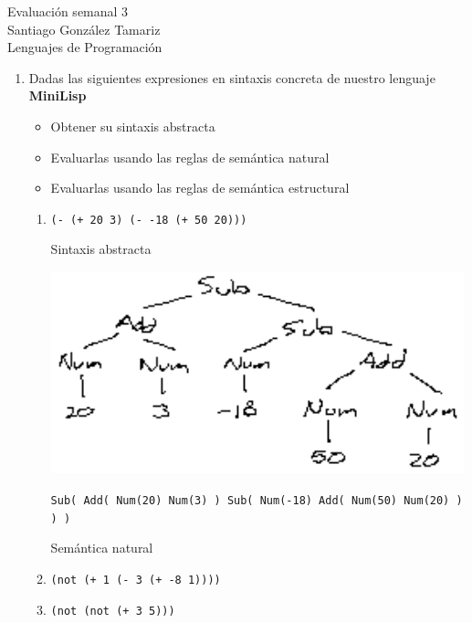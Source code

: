 \documentclass{article}
\begin{document}
  \begin{center}
    {\Large Evaluación semanal 3}\\
    {Santiago González Tamariz}\\
    {\small Lenguajes de Programación}
  \end{center}

  \begin{enumerate}
    \item Dadas las siguientes expresiones en sintaxis concreta de nuestro lenguaje \textbf{MiniLisp}
      \begin{itemize}
        \item Obtener su sintaxis abstracta
        \item Evaluarlas usando las reglas de semántica natural
        \item Evaluarlas usando las reglas de semántica estructural
      \end{itemize}
      \begin{enumerate}
        \item \texttt{(- (+ 20 3) (- -18 (+ 50 20)))}
          
          Sintaxis abstracta
          \begin{center}
            \includegraphics[width=12cm]{asa1.png}
          \end{center}
          \texttt{Sub( Add( Num(20) Num(3) ) Sub( Num(-18) Add( Num(50) Num(20) ) ) )}

          Semántica natural
          \begin{prooftree}
            
          \end{prooftree}

        \item \texttt{(not (+ 1 (- 3 (+ -8 1))))}
        \item \texttt{(not (not (+ 3 5)))}
      \end{enumerate}


\end{enumerate}
\end{document}
